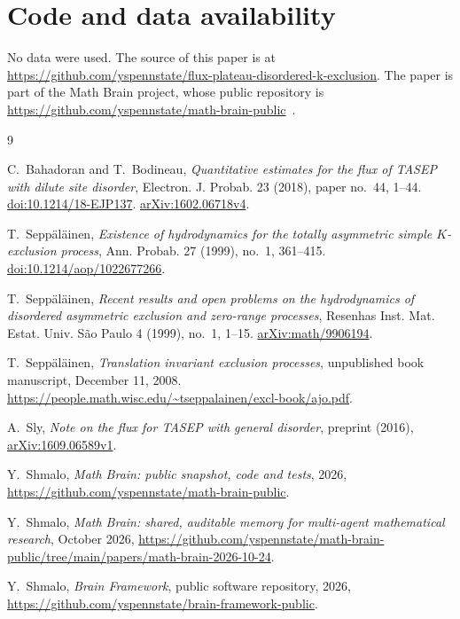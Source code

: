 \documentclass[11pt]{amsart}
\theoremstyle{remark}
\numberwithin{equation}{section}
\begin{document}
\section*{Code and data availability}
No data were used. The source of this paper is at
\url{https://github.com/yspennstate/flux-plateau-disordered-k-exclusion}.
The paper is part of the Math Brain project, whose public repository is
\url{https://github.com/yspennstate/math-brain-public}~\cite{MathBrainRepo}.

\begin{thebibliography}{9}

C.~Bahadoran and T.~Bodineau,
\emph{Quantitative estimates for the flux of TASEP with dilute site disorder},
Electron. J. Probab. \textup{23} (2018), paper no.~44, 1--44.
\href{https://doi.org/10.1214/18-EJP137}{doi:10.1214/18-EJP137}.
\href{https://arxiv.org/abs/1602.06718v4}{arXiv:1602.06718v4}.

T.~Sepp\"al\"ainen,
\emph{Existence of hydrodynamics for the totally asymmetric simple
$K$-exclusion process},
Ann. Probab. \textup{27} (1999), no.~1, 361--415.
\href{https://doi.org/10.1214/aop/1022677266}{doi:10.1214/aop/1022677266}.

T.~Sepp\"al\"ainen,
\emph{Recent results and open problems on the hydrodynamics of disordered
asymmetric exclusion and zero-range processes},
Resenhas Inst. Mat. Estat. Univ. S\~ao Paulo \textup{4} (1999), no.~1, 1--15.
\href{https://arxiv.org/abs/math/9906194}{arXiv:math/9906194}.

T.~Sepp\"al\"ainen,
\emph{Translation invariant exclusion processes},
unpublished book manuscript, December 11, 2008.
\url{https://people.math.wisc.edu/~tseppalainen/excl-book/ajo.pdf}.

A.~Sly,
\emph{Note on the flux for TASEP with general disorder},
preprint (2016), \href{https://arxiv.org/abs/1609.06589v1}{arXiv:1609.06589v1}.

Y.~Shmalo, \emph{Math Brain: public snapshot, code and tests}, 2026,
\url{https://github.com/yspennstate/math-brain-public}.

Y.~Shmalo, \emph{Math Brain: shared, auditable memory for multi-agent
mathematical research}, October 2026,
\url{https://github.com/yspennstate/math-brain-public/tree/main/papers/math-brain-2026-10-24}.

Y.~Shmalo, \emph{Brain Framework}, public software repository, 2026,
\url{https://github.com/yspennstate/brain-framework-public}.
\end{thebibliography}
\end{document}
